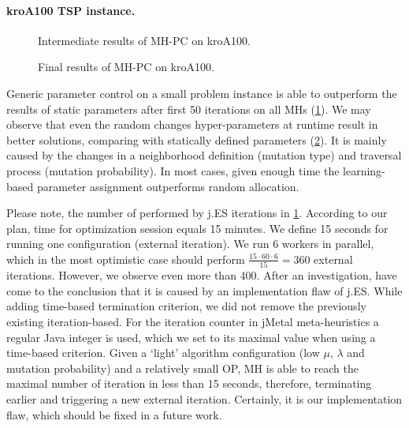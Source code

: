 \paragraph{kroA100 TSP instance.}
\begin{figure}[t]
	\centering
	\vspace{-20pt}
	
	\caption{Intermediate results of MH-PC on kroA100.}
	\vspace{-5pt}
	\label{eval:pict:pc:kroA100 intermediate}
\end{figure}
\begin{figure}[b]
	\centering
	\vspace{-20pt}
	
	\caption{Final results of MH-PC on kroA100.}
	\vspace{-5pt}
	\label{eval:pict:pc:kroA100 final}
\end{figure}

Generic parameter control on a small problem instance is able to outperform the results of static parameters after first 50 iterations on all MHs (\cref{eval:pict:pc:kroA100 intermediate}). We may observe that even the random changes hyper-parameters at runtime result in better solutions, comparing with statically defined parameters (\cref{eval:pict:pc:kroA100 final}). It is mainly caused by the changes in a neighborhood definition (mutation type) and traversal process (mutation probability). In most cases, given enough time the learning-based parameter assignment outperforms random allocation.

Please note, the number of performed by j.ES iterations in \cref{eval:pict:pc:kroA100 intermediate}. According to our plan, time for optimization session equals 15 minutes. We define 15 seconds for running one configuration (external iteration). We run 6 workers in parallel, which in the most optimistic case should perform $\frac{15\cdot60\cdot6}{15} = 360$ external iterations. However, we observe even more than 400. After an investigation, have come to the conclusion that it is caused by an implementation flaw of j.ES. While adding time-based termination criterion, we did not remove the previously existing iteration-based. For the iteration counter in jMetal meta-heuristics a regular Java integer is used, which we set to its maximal value when using a time-based criterion. Given a `light' algorithm configuration (low $\mu$, $\lambda$ and mutation probability) and a relatively small OP, MH is able to reach the maximal number of iteration in less than 15 seconds, therefore, terminating earlier and triggering a new external iteration. Certainly, it is our implementation flaw, which should be fixed in a future work.

